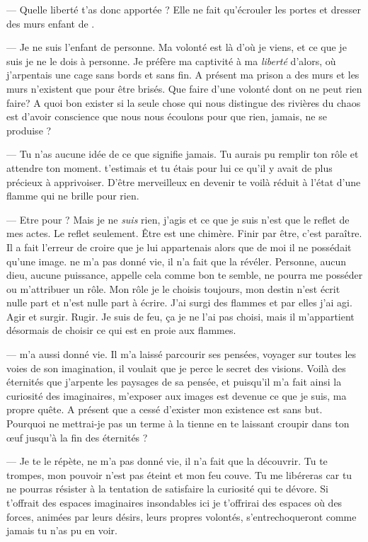 --- Quelle liberté t'as donc apportée \Auga? Elle ne fait qu'écrouler les portes et dresser des murs enfant de \Mey. \n

--- Je ne suis l'enfant de personne. Ma volonté est là d'où je viens, et ce que je suis je ne le dois à personne. Je préfère ma captivité à ma \textit{liberté} d'alors, où j'arpentais une cage sans bords et sans fin. A présent ma prison a des murs et les murs n'existent que pour être brisés. Que faire d'une volonté dont on ne peut rien faire? A quoi bon exister si la seule chose qui nous distingue des rivières du chaos est d'avoir conscience que nous nous écoulons pour que rien, jamais, ne se produise ?\n

--- Tu n'as aucune idée de ce que signifie jamais. Tu aurais pu remplir ton rôle et attendre ton moment. \Mey t'estimais et tu étais pour lui ce qu'il y avait de plus précieux à apprivoiser. D'être merveilleux en devenir te voilà réduit à l'état d'une flamme qui ne brille pour rien.\n

---  Etre pour \Mey? Mais je ne \textit{suis} rien, j'agis et ce que je suis n'est que le reflet de mes actes. Le reflet seulement. Être est une chimère. Finir par être, c'est paraître. Il a fait l'erreur de croire que je lui appartenais alors que de moi il ne possédait qu'une image. \Mey ne m'a pas donné vie, il n'a fait que la révéler. Personne, aucun dieu, aucune puissance, appelle cela comme bon te semble, ne pourra me posséder ou m'attribuer un rôle. Mon rôle je le choisis toujours, mon destin n'est écrit nulle part et n'est nulle part à écrire. J'ai surgi des flammes et par elles j'ai agi. Agir et surgir. Rugir. Je suis de feu, ça je ne l'ai pas choisi, mais il m'appartient désormais de choisir ce qui est en proie aux flammes.


--- \Mey m'a aussi donné vie. Il m'a laissé parcourir ses pensées, voyager sur toutes les voies de son imagination, il voulait que je perce le secret des visions. Voilà des éternités que j'arpente les paysages de sa pensée, et puisqu'il m'a fait ainsi la curiosité des imaginaires, m'exposer aux images est devenue ce que je suis, ma propre quête. A présent que \Mey a cessé d'exister mon existence est sans but. Pourquoi ne mettrai-je pas un terme à la tienne en te laissant croupir dans ton œuf jusqu'à la fin des éternités ?

--- Je te le répète, \Mey ne m'a pas donné vie, il n'a fait que la découvrir. Tu te trompes, mon pouvoir n'est pas éteint et mon feu couve. Tu me libéreras car tu ne pourras résister à la tentation de satisfaire la curiosité qui te dévore. Si \Mey t'offrait des espaces imaginaires insondables ici je t'offrirai des espaces où des forces, animées par leurs désirs, leurs propres volontés, s'entrechoqueront comme jamais tu n'as pu en voir.

